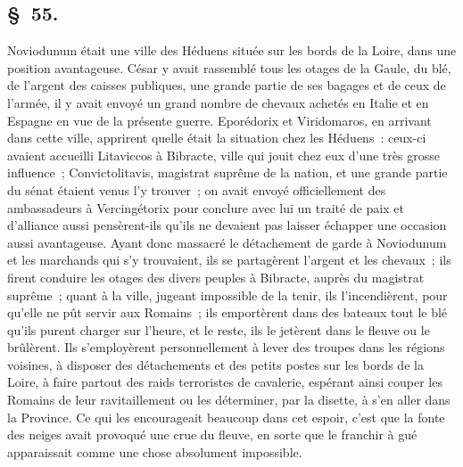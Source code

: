 \documentclass[french,twoside]{book} %
\begin{document}
\subsection[{§ 55.}]{ \textsc{§ 55.} }
\noindent Noviodunum était une ville des Héduens située sur les bords de la Loire, dans une position avantageuse. César y avait rassemblé tous les otages de la Gaule, du blé, de l’argent des caisses publiques, une grande partie de ses bagages et de ceux de l’armée, il y avait envoyé un grand nombre de chevaux achetés en Italie et en Espagne en vue de la présente guerre. Eporédorix et Viridomaros, en arrivant dans cette ville, apprirent quelle était la situation chez les Héduens : ceux-ci avaient accueilli Litaviccos à Bibracte, ville qui jouit chez eux d’une très grosse influence ; Convictolitavis, magistrat suprême de la nation, et une grande partie du sénat étaient venus l’y trouver ; on avait envoyé officiellement des ambassadeurs à Vercingétorix pour conclure avec lui un traité de paix et d’alliance aussi pensèrent-ils qu’ils ne devaient pas laisser échapper une occasion aussi avantageuse. Ayant donc massacré le détachement de garde à Noviodunum et les marchands qui s’y trouvaient, ils se partagèrent l’argent et les chevaux ; ils firent conduire les otages des divers peuples à Bibracte, auprès du magistrat suprême ; quant à la ville, jugeant impossible de la tenir, ils l’incendièrent, pour qu’elle ne pût servir aux Romains ; ils emportèrent dans des bateaux tout le blé qu’ils purent charger sur l’heure, et le reste, ils le jetèrent dans le fleuve ou le brûlèrent. Ils s’employèrent personnellement à lever des troupes dans les régions voisines, à disposer des détachements et des petits postes sur les bords de la Loire, à faire partout des raids terroristes de cavalerie, espérant ainsi couper les Romains de leur ravitaillement ou les déterminer, par la disette, à s’en aller dans la Province. Ce qui les encourageait beaucoup dans cet espoir, c’est que la fonte des neiges avait provoqué une crue du fleuve, en sorte que le franchir à gué apparaissait comme une chose absolument impossible.
\end{document}
